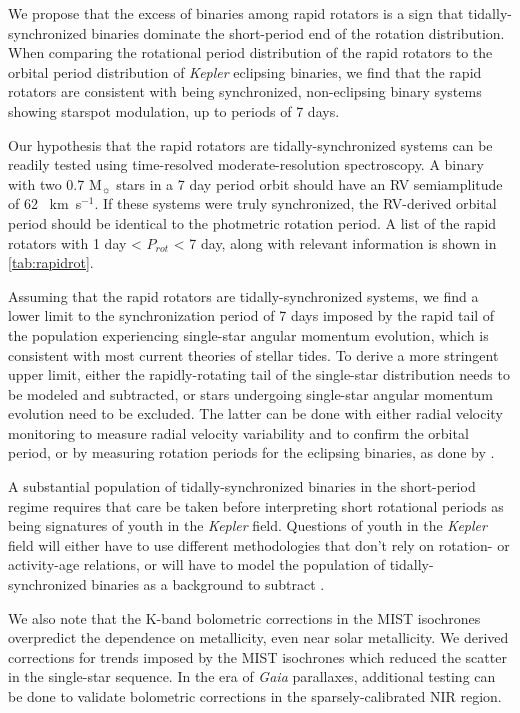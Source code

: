 \documentclass[manuscript]{aastex6}
\newcommand{\Kepler}{\mbox{\textit{Kepler}}}
\newcommand{\Gaia}{\mbox{\textit{Gaia}}}
\newcommand{\kms}{\textrm{~km~s}\ensuremath{^{-1}}}
\begin{document}
We propose that the excess of binaries among rapid rotators is a sign that
tidally-synchronized binaries dominate the short-period end of the rotation
distribution. When comparing the rotational period distribution of the rapid 
rotators to the orbital period distribution of \Kepler{} eclipsing binaries, we
find that the rapid rotators are consistent with being synchronized, 
non-eclipsing binary systems showing starspot modulation, up to periods of 7
days.

Our hypothesis that the rapid rotators are tidally-synchronized systems can be
readily tested using time-resolved moderate-resolution spectroscopy. A binary
with two 0.7 M\(_\sun\) stars in a 7 day period orbit should have an RV
semiamplitude of 62 \kms. If these systems were truly synchronized, the
RV-derived orbital period should be identical to the photmetric rotation
period. A list of the rapid rotators with 1 day < \(P_{rot}\) < 7 day, along
with relevant information is shown in \cref{tab:rapidrot}.

Assuming that the rapid rotators are tidally-synchronized systems, we find a
lower limit to the synchronization period of 7 days imposed by the rapid tail
of the population experiencing single-star angular momentum evolution, which is
consistent with most current theories of stellar tides. To derive a more
stringent upper limit, either the rapidly-rotating tail of the single-star
distribution needs to be modeled and subtracted, or stars undergoing 
single-star angular momentum evolution need to be excluded. The latter can be
done with either radial velocity monitoring to measure radial velocity
variability and to confirm the orbital period, or by measuring rotation periods
for the eclipsing binaries, as done by \citet{Lurie17}.

A substantial population of tidally-synchronized binaries in the short-period 
regime requires that care be taken before interpreting short rotational 
periods as being signatures of youth in the \Kepler{} field. Questions of 
youth in the \Kepler{} field will either have to use different methodologies 
that don't rely on rotation- or activity-age relations, or will have to
model the population of tidally-synchronized binaries as a background to 
subtract . 

We also note that the K-band bolometric corrections in the MIST isochrones
overpredict the dependence on metallicity, even near solar metallicity. We
derived corrections for trends imposed by the MIST isochrones which reduced the
scatter in the single-star sequence. In the era of \Gaia{} parallaxes,
additional testing can be done to validate bolometric corrections in the
sparsely-calibrated NIR region.
\end{document}

